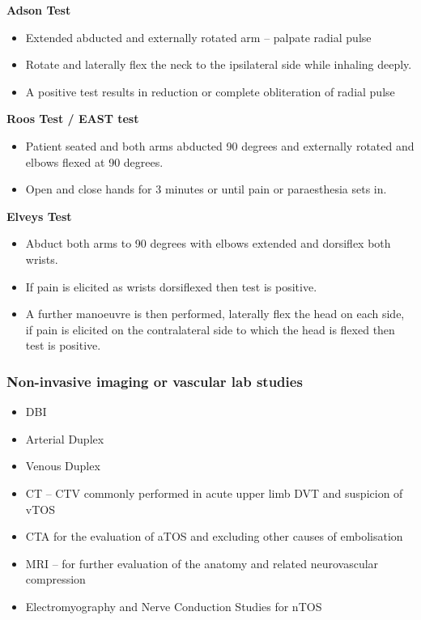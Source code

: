 \documentclass[
]{book}
\begin{document}
\textbf{Adson Test}

\begin{itemize}
\item
  Extended abducted and externally rotated arm -- palpate radial pulse
\item
  Rotate and laterally flex the neck to the ipsilateral side while
  inhaling deeply.
\item
  A positive test results in reduction or complete obliteration of
  radial pulse
\end{itemize}

\textbf{Roos Test / EAST test}

\begin{itemize}
\item
  Patient seated and both arms abducted 90 degrees and externally
  rotated and elbows flexed at 90 degrees.~
\item
  Open and close hands for 3 minutes or until pain or paraesthesia
  sets in.
\end{itemize}

\textbf{Elveys Test}

\begin{itemize}
\item
  Abduct both arms to 90 degrees with elbows extended and dorsiflex
  both wrists.
\item
  If pain is elicited as wrists dorsiflexed then test is positive.
\item
  A further manoeuvre is then performed, laterally flex the head on
  each side, if pain is elicited on the contralateral side to which
  the head is flexed then test is positive.
  \citep{humphries124ThoracicOutlet2019}
\end{itemize}

\hypertarget{non-invasive-imaging-or-vascular-lab-studies}{%
\subsubsection{Non-invasive imaging or vascular lab studies}\label{non-invasive-imaging-or-vascular-lab-studies}}

\begin{itemize}
\item
  DBI
\item
  Arterial Duplex
\item
  Venous Duplex~
\item
  CT -- CTV commonly performed in acute upper limb DVT and suspicion
  of vTOS
\item
  CTA for the evaluation of aTOS and excluding other causes of
  embolisation
\item
  MRI -- for further evaluation of the anatomy and related
  neurovascular compression
\item
  Electromyography and Nerve Conduction Studies for nTOS
\end{itemize}
\end{document}
